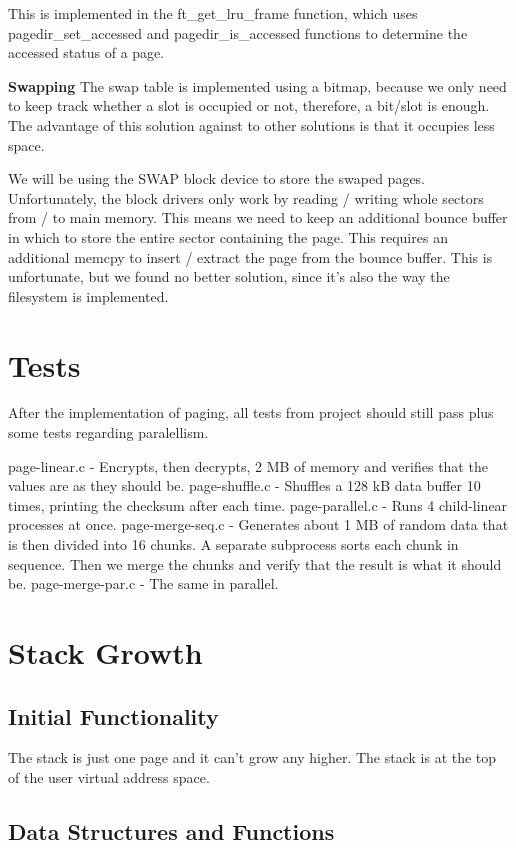 This is implemented in the ft_get_lru_frame function, which uses pagedir_set_accessed and pagedir_is_accessed functions to determine the accessed status of a page.

\textbf{Swapping}
The swap table is implemented using a bitmap, because we only need to keep track whether a slot is occupied or not, therefore, a bit/slot is enough. The advantage of this solution against to other solutions is that it occupies less space.

We will be using the SWAP block device to store the swaped pages. Unfortunately, the block drivers only work by reading / writing whole sectors from / to main memory. This means we need to keep an additional bounce buffer in which to store the entire sector containing the page. This requires an additional memcpy to insert / extract the page from the bounce buffer. This is unfortunate, but we found no better solution, since it's also the way the filesystem is implemented.

\section{Tests}

After the implementation of paging, all tests from project should still pass plus some tests regarding paralellism.

page-linear.c - Encrypts, then decrypts, 2 MB of memory and verifies that the values are as they should be.
page-shuffle.c - Shuffles a 128 kB data buffer 10 times, printing the checksum after each time.
page-parallel.c - Runs 4 child-linear processes at once.
page-merge-seq.c - Generates about 1 MB of random data that is then divided into 16 chunks.  A separate subprocess sorts each chunk in sequence.  Then we merge the chunks and verify that the result is what it should be.
page-merge-par.c - The same in parallel.

\section{Stack Growth}
\subsection{Initial Functionality}

The stack is just one page and it can't grow any higher. The stack is at the top of the user
virtual address space.

\subsection{Data Structures and Functions}

